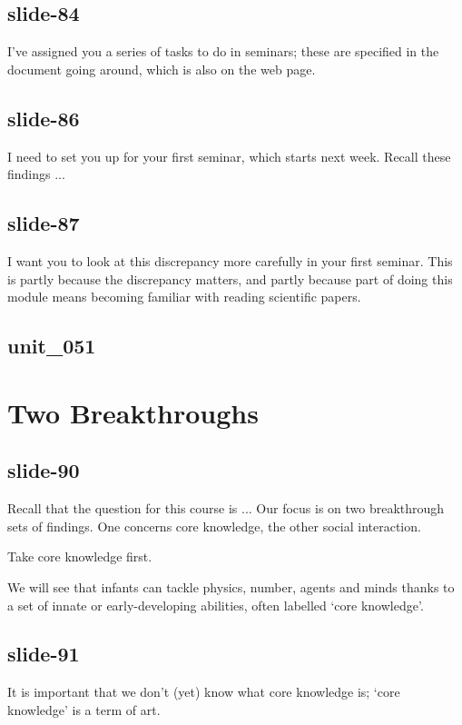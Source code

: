 \documentclass[12pt,\papersize]{extarticle}
\begin{document}
 
 
\subsection{slide-84}
I've assigned you a series of tasks to do in seminars; these are specified in the document going around, which is also on the web page.
 
 
 
\subsection{slide-86}
I need to set you up for your first seminar, which starts next week. Recall these findings ...
 
 
 
\subsection{slide-87}
I want you to look at this discrepancy more carefully in your first seminar. This is partly because the discrepancy matters, and partly because part of doing this module means becoming familiar with reading scientific papers.
 
 
 
\subsection{unit\_051}
 
 
\section{Two Breakthroughs}
 
 
 
\subsection{slide-90}
Recall that the question for this course is ... Our focus is on two breakthrough sets of findings. One concerns core knowledge, the other social interaction.
 
Take core knowledge first.
 
We will see that infants can tackle physics, number, agents and minds thanks to a set of innate or early-developing abilities, often labelled `core knowledge'.
 
 
 
\subsection{slide-91}
It is important that we don't (yet) know what core knowledge is; `core knowledge' is a term of art.
 
\end{document}

